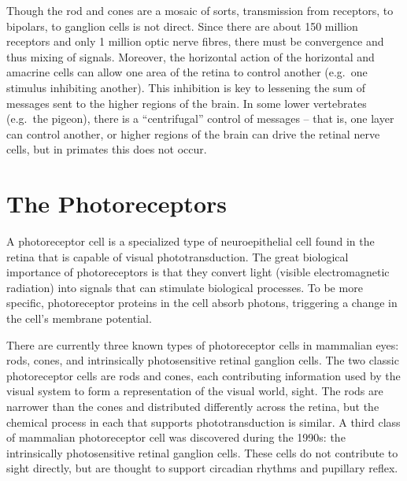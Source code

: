 \documentclass[]{book}
\begin{document}
Though the rod and cones are a mosaic of sorts, transmission from receptors, to bipolars, to ganglion cells is not direct. Since there are about 150 million receptors and only 1 million optic nerve fibres, there must be convergence and thus mixing of signals. Moreover, the horizontal action of the horizontal and amacrine cells can allow one area of the retina to control another (e.g.~one stimulus inhibiting another). This inhibition is key to lessening the sum of messages sent to the higher regions of the brain. In some lower vertebrates (e.g.~the pigeon), there is a ``centrifugal'' control of messages -- that is, one layer can control another, or higher regions of the brain can drive the retinal nerve cells, but in primates this does not occur.

\hypertarget{the-photoreceptors}{%
\section{The Photoreceptors}\label{the-photoreceptors}}

A photoreceptor cell is a specialized type of neuroepithelial cell found in the retina that is capable of visual phototransduction. The great biological importance of photoreceptors is that they convert light (visible electromagnetic radiation) into signals that can stimulate biological processes. To be more specific, photoreceptor proteins in the cell absorb photons, triggering a change in the cell's membrane potential.

There are currently three known types of photoreceptor cells in mammalian eyes: rods, cones, and intrinsically photosensitive retinal ganglion cells. The two classic photoreceptor cells are rods and cones, each contributing information used by the visual system to form a representation of the visual world, sight. The rods are narrower than the cones and distributed differently across the retina, but the chemical process in each that supports phototransduction is similar. A third class of mammalian photoreceptor cell was discovered during the 1990s: the intrinsically photosensitive retinal ganglion cells. These cells do not contribute to sight directly, but are thought to support circadian rhythms and pupillary reflex.
\end{document}
